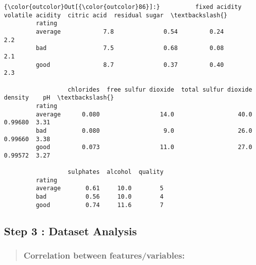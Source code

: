 \documentclass[11pt]{article}
\begin{document}
\begin{Verbatim}[commandchars=\\\{\}]
{\color{outcolor}Out[{\color{outcolor}86}]:}          fixed acidity  volatile acidity  citric acid  residual sugar  \textbackslash{}
         rating                                                                  
         average            7.8              0.54         0.24             2.2   
         bad                7.5              0.68         0.08             2.1   
         good               8.7              0.37         0.40             2.3   
         
                  chlorides  free sulfur dioxide  total sulfur dioxide  density    pH  \textbackslash{}
         rating                                                                         
         average      0.080                 14.0                  40.0  0.99680  3.31   
         bad          0.080                  9.0                  26.0  0.99660  3.38   
         good         0.073                 11.0                  27.0  0.99572  3.27   
         
                  sulphates  alcohol  quality  
         rating                                
         average       0.61     10.0        5  
         bad           0.56     10.0        4  
         good          0.74     11.6        7  
\end{Verbatim}
            
    \subsection{Step 3 : Dataset Analysis}\label{step-3-dataset-analysis}

    \begin{quote}
\subsubsection{Correlation between
features/variables:}\label{correlation-between-featuresvariables}
\end{quote}
\end{document}
